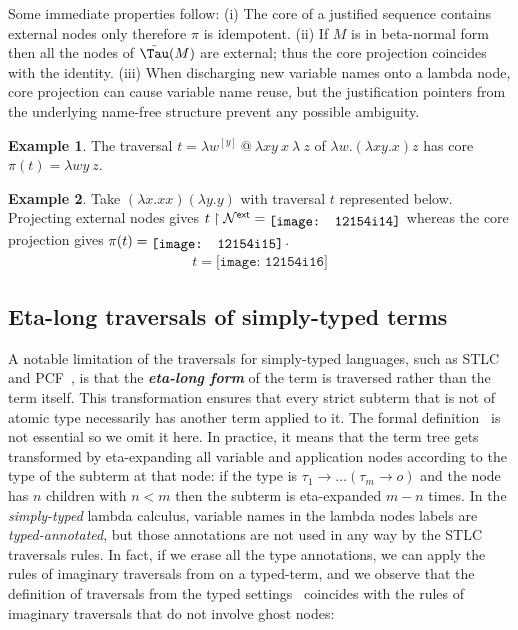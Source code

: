 \documentclass[xchauthor,chkrefs,GCNS,amsmath,amsthm,rotating,leaveRGB]{tcsg}
\renewcommand{\index}[1]{}
\theoremstyle{plain}
\theoremstyle{definition}
\newtheorem{example}{Example}[section]
\newcommand{\Nodes}{\mathcal{N}}
\def\coresymbol{\pi}
\newcommand{\exttree}{\tilde{\Tau}}
\newcommand{\ExternalNodes}{\Nodes^{\mathsf{ext}}}
\begin{document}
Some immediate properties follow: (i) The core of a justified sequence
contains external nodes only therefore $\coresymbol $ is idempotent. (ii) If
$M$ is in beta-normal form then all the nodes of $\exttree (M)$ are external;
thus the core projection coincides with the identity. (iii) When discharging
new variable names onto a lambda node, core projection can cause variable
name reuse, but the justification pointers from the underlying name-free
structure prevent any possible ambiguity.

\begin{example}
The traversal $t = \lambda w^{[y]} ~ @ ~ \lambda x y ~ x ~ \lambda ~ z$ of
$\lambda w . (\lambda x y .x) z$ has core $\coresymbol (t) = \lambda w y ~
z$.
\end{example}


\begin{example}
Take $(\lambda x. x x)(\lambda y. y)$ with traversal $t$ represented below.
Projecting external nodes gives $t\upharpoonright  \ExternalNodes =
\raisebox{-2pt}{\texttt{[image: 12154i14]}}$ whereas the core projection gives $\coresymbol
(t) = \raisebox{-2pt}{\texttt{[image: 12154i15]}}$.
%
\begin{eqnarray*}
t = \texttt{[image: 12154i16]}
\end{eqnarray*}
\end{example}



\subsection{Eta-long traversals of simply-typed terms}\label{sec3.2}

A notable limitation of the traversals for simply-typed languages, such as
STLC and PCF~\cite{BlumPhd}, is that the \textbf{\emph{eta-long
form}}\index{eta-long form} of the term is traversed rather than the term
itself. This transformation ensures that every strict subterm that is not of
atomic type  necessarily has another term applied to it. The formal
definition~\cite{huet75-unification,BlumPhd,OngLics2006} is not essential so
we omit it here. In practice, it means that the term tree gets transformed by
eta-expanding all variable and application nodes according to the type of the
subterm at that node: if the type is $\tau _{1} \rightarrow \ldots (\tau _{m}
\rightarrow o)$ and the node has $n$ children with $n< m$ then the subterm is
eta-expanded $m-n$ times. In the \emph{simply-typed} lambda calculus,
variable names in the lambda nodes labels are \emph{typed-annotated}, but
those annotations are not used in any way by the STLC traversals rules. In
fact, if we erase all the type annotations, we can apply the rules of
imaginary traversals from  on a
typed-term, and we observe that the definition of traversals from the typed
settings~\cite{BlumPhd} coincides with the rules of imaginary traversals that
do not involve ghost nodes:
\end{document}
